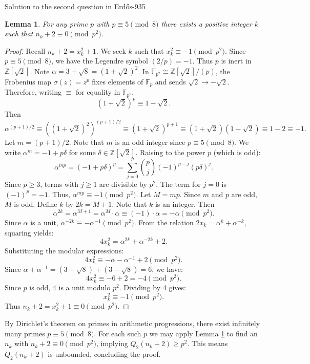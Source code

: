 \documentclass{article}
\theoremstyle{plain}
\newtheorem{lemma}{Lemma}
\theoremstyle{definition}
\begin{document}
\begin{solution}{Solution to the second question in Erdős-935}
\begin{lemma} \label{lemma : n_k+2 modulo p^2}
For any prime $p$ with $p \equiv 5 \pmod 8$ there exists a positive integer $k$ such that $n_k + 2 \equiv 0 \pmod{p^2}$.
\end{lemma}
\begin{proof}
Recall $n_k+2 = x_k^2+1$. We seek $k$ such that $x_k^2 \equiv -1 \pmod{p^2}$.
Since $p \equiv 5 \pmod 8$, we have the Legendre symbol $(2/p) = -1$. Thus $p$ is inert in $\mathbb{Z}[\sqrt{2}]$.
Note $\alpha = 3 + \sqrt{8} = (1+\sqrt{2})^2$.
In $\mathbb{F}_{p^2} \cong \mathbb{Z}[\sqrt{2}]/(p)$, the Frobenius map $\sigma(z) = z^p$ fixes elements of $\mathbb{F}_p$ and sends $\sqrt{2} \to -\sqrt{2}$.
Therefore, writing $\equiv$ for equality in $\mathbb F_{p^2}$,
\[ (1+\sqrt{2})^p \equiv 1 - \sqrt{2}. \]
Then
\[ \alpha^{(p+1)/2} \equiv \left((1+\sqrt{2})^2\right)^{(p+1)/2} \equiv (1+\sqrt{2})^{p+1} \equiv (1+\sqrt{2})(1-\sqrt{2}) \equiv 1 - 2 \equiv -1. \]
Let $m = (p+1)/2$. Note that $m$ is an odd integer since $p \equiv 5 \pmod 8$. We write $\alpha^m = -1 + p\delta$ for some $\delta \in \mathbb{Z}[\sqrt{2}]$.
Raising to the power $p$ (which is odd):
\[ \alpha^{mp} = (-1 + p\delta)^p = \sum_{j=0}^p \binom{p}{j}(-1)^{p-j}(p\delta)^j. \]
Since $p \ge 3$, terms with $j \ge 1$ are divisible by $p^2$. The term for $j=0$ is $(-1)^p = -1$.
Thus, $\alpha^{mp} \equiv -1 \pmod{p^2}$.
Let $M = mp$. Since $m$ and $p$ are odd, $M$ is odd.
Define $k$ by $2k = M+1$. Note that $k$ is an integer.
Then
\[ \alpha^{2k} = \alpha^{M+1} = \alpha^M \cdot \alpha \equiv (-1) \cdot \alpha = -\alpha \pmod{p^2}. \]
Since $\alpha$ is a unit, $\alpha^{-2k} \equiv -\alpha^{-1} \pmod{p^2}$.
From the relation $2x_k = \alpha^k + \alpha^{-k}$, squaring yields:
\[ 4x_k^2 = \alpha^{2k} + \alpha^{-2k} + 2. \]
Substituting the modular expressions:
\[ 4x_k^2 \equiv -\alpha - \alpha^{-1} + 2 \pmod{p^2}. \]
Since $\alpha + \alpha^{-1} = (3+\sqrt{8}) + (3-\sqrt{8}) = 6$, we have:
\[ 4x_k^2 \equiv -6 + 2 = -4 \pmod{p^2}. \]
Since $p$ is odd, 4 is a unit modulo $p^2$. Dividing by 4 gives:
\[ x_k^2 \equiv -1 \pmod{p^2}. \]
Thus $n_k+2 = x_k^2+1 \equiv 0 \pmod{p^2}$.
\end{proof}

By Dirichlet's theorem on primes in arithmetic progressions, there exist infinitely many primes $p \equiv 5 \pmod 8$. For each such $p$ we may apply Lemma \ref{lemma : n_k+2 modulo p^2} to find an $n_{k}$ with $n_{k}+2\equiv 0\pmod {p^2}$, implying $Q_2(n_{k}+2)\geq p^2$. This means $Q_{2}(n_{k}+2)$ is unbounded, concluding the proof.

\end{solution}
\end{document}
